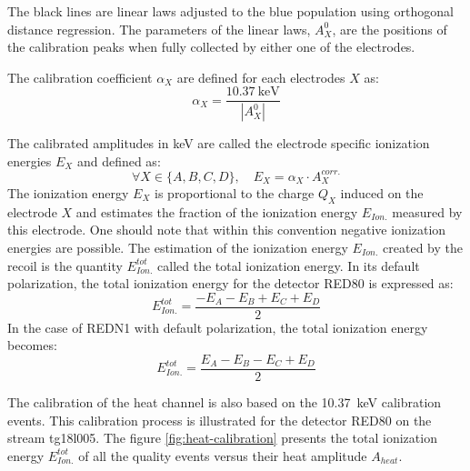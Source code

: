The black lines are linear laws adjusted to the blue population using orthogonal distance regression. The parameters of the linear laws, $A_X^0$, are the positions of the calibration peaks when fully collected by either one of the electrodes. 

The calibration coefficient $\alpha_X$ are defined for each electrodes $X$ as:
\begin{equation}
\alpha_X = \frac{\SI{10.37}{\kilo\eV}}{|A_X^0|}
\end{equation}

The calibrated amplitudes in \si{\kilo\eV} are called the electrode specific ionization energies $E_X$ and defined as:
\begin{equation}
\forall X \in \{ A, B ,C,D \}, \quad 
E_X = \alpha_X \cdot A_X^{corr.}
\end{equation}
The ionization energy $E_X$ is proportional to the charge $Q_X$ induced on the electrode $X$ and estimates the fraction of the ionization energy $E_{Ion.}$ measured by this electrode. One should note that within this convention negative ionization energies are possible. The estimation of the ionization energy $E_{Ion.}$ created by the recoil is the quantity $E_{Ion.}^{tot}$ called the total ionization energy. In its default polarization, the total ionization energy for the detector RED80 is expressed as:
\begin{equation}
E_{Ion.}^{tot} = \frac{-E_A -E_B + E_C + E_D}{2}
\end{equation}
In the case of REDN1 with default polarization, the total ionization energy becomes:
\begin{equation}
E_{Ion.}^{tot} = \frac{E_A - E_B - E_C + E_D}{2}
\end{equation}

The calibration of the heat channel is also based on the \SI{10.37}{\kilo\eV} calibration events. This calibration process is illustrated for the detector RED80 on the stream tg18l005. The figure \ref{fig:heat-calibration} presents the total ionization energy $E_{Ion.}^{tot}$ of all the quality events versus their heat amplitude $A_{heat}$.

